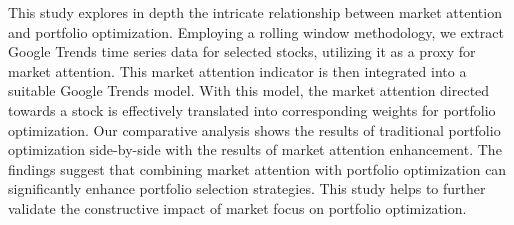 
\begin{Abstrakt}
    This study explores in depth the intricate relationship between market attention and portfolio optimization. Employing a rolling window methodology, we extract Google Trends time series data for selected stocks, utilizing it as a proxy for market attention. This market attention indicator is then integrated into a suitable Google Trends model. With this model, the market attention directed towards a stock is effectively translated into corresponding weights for portfolio optimization. Our comparative analysis shows the results of traditional portfolio optimization side-by-side with the results of market attention enhancement. The findings suggest that combining market attention with portfolio optimization can significantly enhance portfolio selection strategies. This study helps to further validate the constructive impact of market focus on portfolio optimization.
\end{Abstrakt}



\clearpage